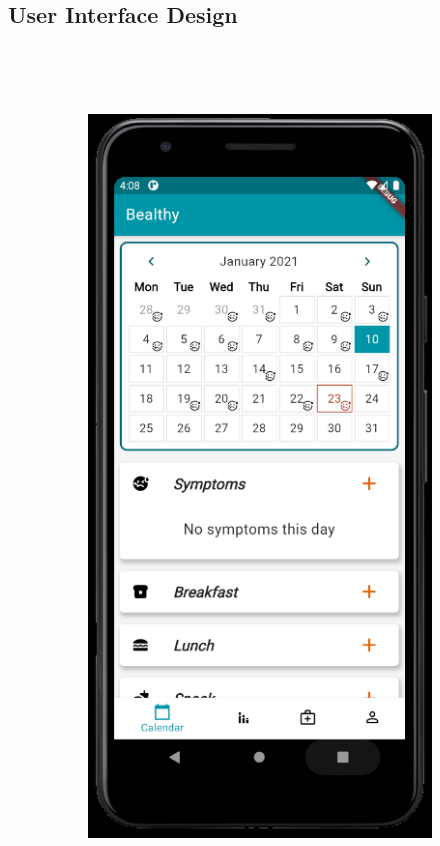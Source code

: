 \documentclass [12pt]{article}
\begin{document}
\subsection{User Interface Design}
\
\begin{description}[leftmargin=1cm,rightmargin=1cm]
\item [  1)Home page]
\
\
\
\begin{figure}[h!]
\centering
\hspace*{\fill}
\begin{subfigure}[tl]{0.3\linewidth}
\includegraphics[width=\linewidth]{HomePage1.PNG}

\end{subfigure}
\end{figure}
\end{description}
\end{document}
